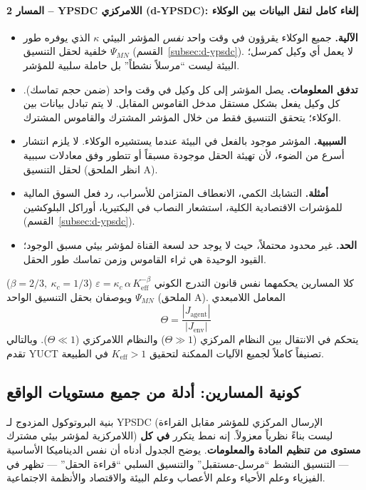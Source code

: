 \documentclass[11pt,a4paper]{article}
\begin{document}
	\paragraph*{المسار 2 – YPSDC اللامركزي (d‑YPSDC): إلغاء كامل لنقل البيانات بين الوكلاء}
	\begin{itemize}[leftmargin=*]
		\item \textbf{الآلية.} جميع الوكلاء يقرؤون في وقت واحد \emph{نفس} المؤشر البيئي $\kappa$ الذي يوفره طور خلفية لحقل التنسيق $\Psi_{MN}$ (القسم~\ref{subsec:d-ypsdc}). لا يعمل أي وكيل كمرسل؛ البيئة ليست ``مرسلاً نشطاً'' بل حاملة سلبية للمؤشر.
		\item \textbf{تدفق المعلومات.} يصل المؤشر إلى كل وكيل في وقت واحد (ضمن حجم تماسك). كل وكيل يفعل بشكل مستقل مدخل القاموس المقابل. لا يتم تبادل بيانات بين الوكلاء؛ يتحقق التنسيق فقط من خلال المؤشر المشترك والقاموس المشترك.
		\item \textbf{السببية.} المؤشر موجود بالفعل في البيئة عندما يستشيره الوكلاء. لا يلزم انتشار أسرع من الضوء، لأن تهيئة الحقل موجودة مسبقاً أو تتطور وفق معادلات سببية لحقل التنسيق (انظر الملحق A).
		\item \textbf{أمثلة.} التشابك الكمي، الانعطاف المتزامن للأسراب، رد فعل السوق المالية للمؤشرات الاقتصادية الكلية، استشعار النصاب في البكتيريا، أوراكل البلوكشين (القسم~\ref{subsec:d-ypsdc}).
		\item \textbf{الحد.} غير محدود محتملاً، حيث لا يوجد حد لسعة القناة لمؤشر بيئي مسبق الوجود؛ القيود الوحيدة هي ثراء القاموس وزمن تماسك طور الحقل.
	\end{itemize}
	
	\medskip
	\noindent
	كلا المسارين يحكمهما نفس قانون التدرج الكوني $\varepsilon = \kappa_c \, \alpha \, K_{\mathrm{eff}}^{-\beta}$ ($\beta = 2/3,\ \kappa_c = 1/3$) ويوصفان بحقل التنسيق الواحد $\Psi_{MN}$ (الملحق A). المعامل اللامبعدي 
	\[
	\Theta = \frac{|J_{\mathrm{agent}}|}{|J_{\mathrm{env}}|}
	\]
	يتحكم في الانتقال بين النظام المركزي ($\Theta \gg 1$) والنظام اللامركزي ($\Theta \ll 1$). وبالتالي تقدم YUCT تصنيفاً كاملاً لجميع الآليات الممكنة لتحقيق $K_{\mathrm{eff}} > 1$ في الطبيعة.
	
	\subsection{كونية المسارين: أدلة من جميع مستويات الواقع}
	\label{subsec:universality-two-paths}
	
	بنية البروتوكول المزدوج لـ YPSDC (الإرسال المركزي للمؤشر مقابل القراءة اللامركزية لمؤشر بيئي مشترك) ليست بناءً نظرياً معزولاً. إنه نمط يتكرر \textbf{في كل مستوى من تنظيم المادة والمعلومات}. يوضح الجدول أدناه أن نفس الديناميكا الأساسية — التنسيق النشط ``مرسل-مستقبل'' والتنسيق السلبي ``قراءة الحقل'' — تظهر في الفيزياء وعلم الأحياء وعلم الأعصاب وعلم البيئة والاقتصاد والأنظمة الاجتماعية.
	
\end{document}
